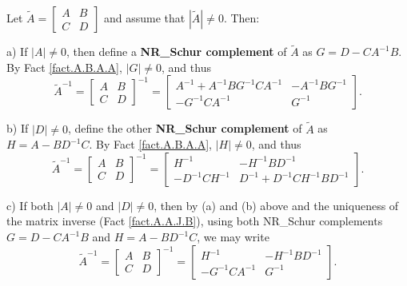 \begin{fact} \label{fact.A.B.A.B}
Let $\tilde A=\begin{bmatrix} A & B \\ C & D \end{bmatrix}$
and assume that $|\tilde A|\ne 0$.  Then:

\noindent a) If $|A|\ne 0$, then define a {\bf NR_Schur complement} of
$\tilde A$ as $G=D-CA^{-1}B$.  By Fact \ref{fact.A.B.A.A}, $|G|\ne 0$, and thus
\begin{equation*}
    \tilde A^{-1} = \begin{bmatrix} A & B \\ C & D \end{bmatrix}^{-1} =
    \begin{bmatrix} A^{-1}+A^{-1} B G^{-1} C A^{-1} & -A^{-1} B G^{-1} \\ -G^{-1} C A^{-1} & G^{-1} \end{bmatrix}.
\end{equation*}

\noindent b) If $|D|\ne 0$, define the other {\bf NR_Schur
complement} of $\tilde A$ as $H=A-BD^{-1}C$.  By Fact \ref{fact.A.B.A.A}, $|H|\ne 0$, and thus
\begin{equation*}
    \tilde A^{-1} = \begin{bmatrix} A & B \\ C & D \end{bmatrix}^{-1} =
    \begin{bmatrix} H^{-1} & -H^{-1} B D^{-1} \\ - D^{-1} C H^{-1} & D^{-1}+ D^{-1} C H^{-1} B D^{-1}  \end{bmatrix}.
\end{equation*}

\noindent c) If both $|A|\ne 0$ and $|D|\ne 0$, then by (a) and (b) above and the uniqueness of the matrix inverse (Fact \ref{fact.A.A.J.B}),
using both NR_Schur complements $G=D-CA^{-1}B$ and $H=A-BD^{-1}C$, we may write
\begin{equation*}
    \tilde A^{-1} = \begin{bmatrix} A & B \\ C & D \end{bmatrix}^{-1} =
    \begin{bmatrix} H^{-1} & -H^{-1}BD^{-1} \\  -G^{-1}CA^{-1} & G^{-1} \end{bmatrix}.
\end{equation*}
\end{fact}

